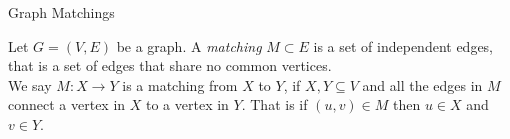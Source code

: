 \documentclass{beamer}
\begin{document}
\begin{frame}{\secname}{Graph Matchings}
    
    
    \begin{definition}[Matching]
        Let $G=(V,E)$ be a graph. A \textit{matching} $M\subset E$ is a set of independent edges, that is a set of edges that share no common vertices.\\
        
         We say $M:X \to Y$ is a matching from $X$ to $Y$, if $X,Y\subseteq V$ and all the edges in $M$ connect a vertex in $X$ to a vertex in $Y$. That is if $(u,v)\in M$ then $u\in X$ and $v\in Y$. 
        
    \end{definition}


\end{frame}
\end{document}
